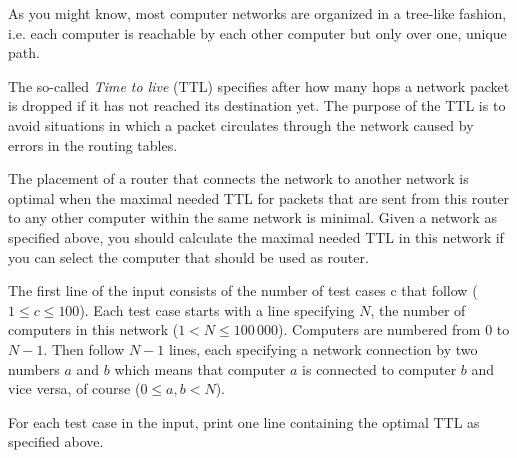 As you might know, most computer networks are organized in a tree-like fashion, i.e. each computer is reachable by each other computer but only over one, unique path.

The so-called \emph{Time to live} (TTL) specifies after how many hops a network packet is dropped if it has not reached its destination yet.
The purpose of the TTL is to avoid situations in which a packet circulates through the network caused by errors in the routing tables.

The placement of a router that connects the network to another network is optimal when the maximal needed TTL for packets that are sent from this router to any other computer within the same network is minimal.
Given a network as specified above, you should calculate the maximal needed TTL in this network if you can select the computer that should be used as router.

\begin{Input}
    The first line of the input consists of the number of test cases c that follow ($1 \leq c \leq 100$).
    Each test case starts with a line specifying $N$, the number of computers in this network ($1 < N \leq 100\,000$).
    Computers are numbered from $0$ to $N-1$.
    Then follow $N-1$ lines, each specifying a network connection by two numbers $a$ and $b$ which means that computer $a$ is connected to computer $b$ and vice versa, of course ($0 \leq a, b < N$).
\end{Input}

\begin{Output}
    For each test case in the input, print one line containing the optimal TTL as specified above.
\end{Output}
